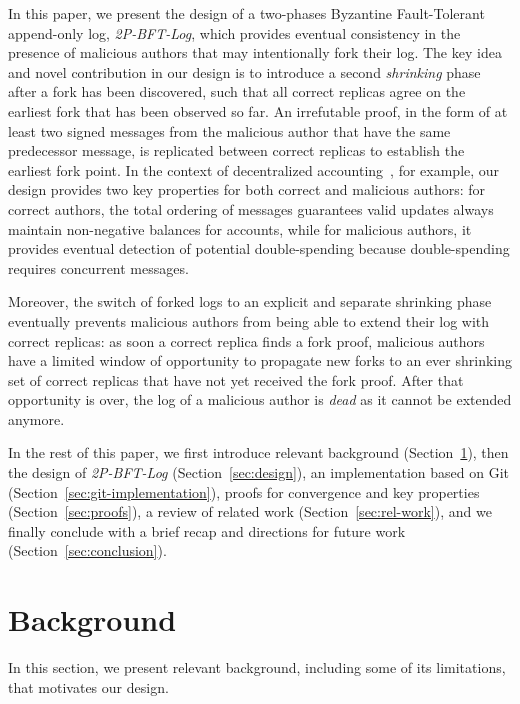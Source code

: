 \documentclass[9pt, oneside]{article}   	%
\begin{document}
In this paper, we present the design of a two-phases Byzantine Fault-Tolerant append-only log, \textit{2P-BFT-Log}, which provides eventual consistency in the presence of malicious authors that may intentionally fork their log. The key idea and novel contribution in our design is to introduce a second \textit{shrinking} phase after a fork has been discovered, such that all correct replicas agree on the earliest fork that has been observed so far. An irrefutable proof, in the form of at least two signed messages from the malicious author that have the same predecessor message, is replicated between correct replicas to establish the earliest fork point. In the context of decentralized accounting~\cite{lavoie2023gocledger}, for example, our design provides two key properties for both correct and malicious authors: for correct authors, the total ordering of messages guarantees valid updates always maintain non-negative balances for accounts, while for malicious authors, it provides eventual detection of potential double-spending because double-spending requires concurrent messages.

Moreover, the switch of forked logs to an explicit and separate shrinking phase eventually prevents malicious authors from being able to extend their log with correct replicas: as soon a correct replica finds a fork proof, malicious authors have a limited window of opportunity to propagate new forks to an ever shrinking set of correct replicas that have not yet received the fork proof. After that opportunity is over, the log of a malicious author is \textit{dead} as it cannot be extended anymore.

In the rest of this paper, we first introduce relevant background (Section~\ref{sec:background}), then the design of \textit{2P-BFT-Log} (Section~\ref{sec:design}), an implementation based on Git (Section~\ref{sec:git-implementation}),  proofs for convergence and key properties (Section~\ref{sec:proofs}), a review of related work (Section~\ref{sec:rel-work}), and we finally conclude with a brief recap and directions for future work (Section~\ref{sec:conclusion}).



\section{Background}
\label{sec:background}

In this section, we present relevant background, including some of its limitations, that motivates our design.
\end{document}
